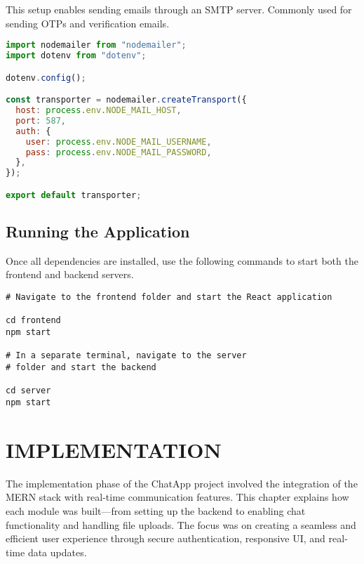 \documentclass[12pt,a4paper]{report}
\begin{document}
This setup enables sending emails through an SMTP server. Commonly used for sending OTPs and verification emails.

\begin{lstlisting}[language=JavaScript, caption={nodemailer.js}, label={lst:nodemailer}]
import nodemailer from "nodemailer";
import dotenv from "dotenv";

dotenv.config();

const transporter = nodemailer.createTransport({
  host: process.env.NODE_MAIL_HOST,
  port: 587,
  auth: {
    user: process.env.NODE_MAIL_USERNAME,
    pass: process.env.NODE_MAIL_PASSWORD, 
  },
});

export default transporter;
\end{lstlisting}

\newpage

\section{Running the Application}

Once all dependencies are installed, use the following commands to start both the frontend and backend servers.

\begin{verbatim}
# Navigate to the frontend folder and start the React application

cd frontend
npm start

# In a separate terminal, navigate to the server 
# folder and start the backend

cd server
npm start

\end{verbatim}


\chapter{IMPLEMENTATION}

The implementation phase of the ChatApp project involved the integration of the MERN stack with real-time communication features. This chapter explains how each module was built—from setting up the backend to enabling chat functionality and handling file uploads. The focus was on creating a seamless and efficient user experience through secure authentication, responsive UI, and real-time data updates.
\end{document}
